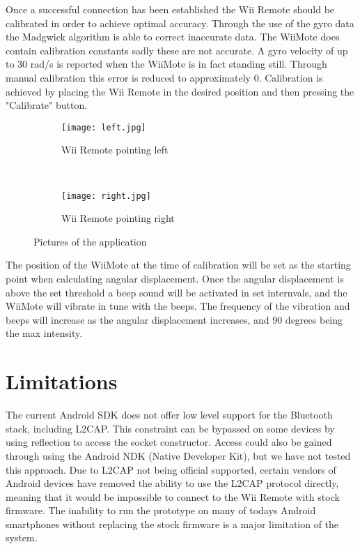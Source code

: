 Once a successful connection has been established the Wii Remote should be calibrated in order to achieve optimal accuracy. Through the use of the gyro data the Madgwick algorithm is able to correct inaccurate data. The WiiMote does contain calibration constants sadly these are not accurate. A gyro velocity of up to 30 rad/s is reported when the WiiMote is in fact standing still. Through manual calibration this error is reduced to approximately 0. Calibration is achieved by placing the Wii Remote in the desired position and then pressing the "Calibrate" button.

\begin{figure}[h!]
        \centering
        \begin{subfigure}[b]{0.8\textwidth}
                \centering
                \texttt{[image: left.jpg]}
                \caption{Wii Remote pointing left}
                \label{fig:left}
        \end{subfigure}
        \\%
        \begin{subfigure}[b]{0.8\textwidth}
                \centering
                \texttt{[image: right.jpg]}
                \caption{Wii Remote pointing right}
                \label{fig:right}
        \end{subfigure}
        \caption{Pictures of the application}\label{fig:application}
\end{figure}

The position of the WiiMote at the time of calibration will be set as the starting point when calculating angular displacement. Once the angular displacement is above the set threshold a beep sound will be activated in set internvals, and the WiiMote will vibrate in tune with the beeps. The frequency of the vibration and beeps will increase as the angular displacement increases, and 90 degrees being the max intensity.

\section{Limitations}
The current Android SDK does not offer low level support for the Bluetooth stack, including L2CAP. This constraint can be bypassed on some devices by using reflection to access the socket constructor\cite{l2capHtc}. Access could also be gained through using the Android NDK (Native Developer Kit), but we have not tested this approach. Due to L2CAP not being official supported, certain vendors of Android devices have removed the ability to use the L2CAP protocol directly, meaning that it would be impossible to connect to the Wii Remote with stock firmware. The inability to run the prototype on many of todays Android smartphones without replacing the stock firmware is a major limitation of the system.

